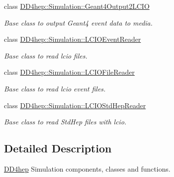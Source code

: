 \begin{DoxyCompactItemize}
class \hyperlink{class_d_d4hep_1_1_simulation_1_1_geant4_output2_l_c_i_o}{D\+D4hep\+::\+Simulation\+::\+Geant4\+Output2\+L\+C\+IO}
\begin{DoxyCompactList}\small\item\em Base class to output Geant4 event data to media. \end{DoxyCompactList}\item 
class \hyperlink{class_d_d4hep_1_1_simulation_1_1_l_c_i_o_event_reader}{D\+D4hep\+::\+Simulation\+::\+L\+C\+I\+O\+Event\+Reader}
\begin{DoxyCompactList}\small\item\em Base class to read lcio files. \end{DoxyCompactList}\item 
class \hyperlink{class_d_d4hep_1_1_simulation_1_1_l_c_i_o_file_reader}{D\+D4hep\+::\+Simulation\+::\+L\+C\+I\+O\+File\+Reader}
\begin{DoxyCompactList}\small\item\em Base class to read lcio event files. \end{DoxyCompactList}\item 
class \hyperlink{class_d_d4hep_1_1_simulation_1_1_l_c_i_o_std_hep_reader}{D\+D4hep\+::\+Simulation\+::\+L\+C\+I\+O\+Std\+Hep\+Reader}
\begin{DoxyCompactList}\small\item\em Base class to read Std\+Hep files with lcio. \end{DoxyCompactList}\end{DoxyCompactItemize}


\subsection{Detailed Description}
\hyperlink{namespace_d_d4hep}{D\+D4hep} Simulation components, classes and functions. 


